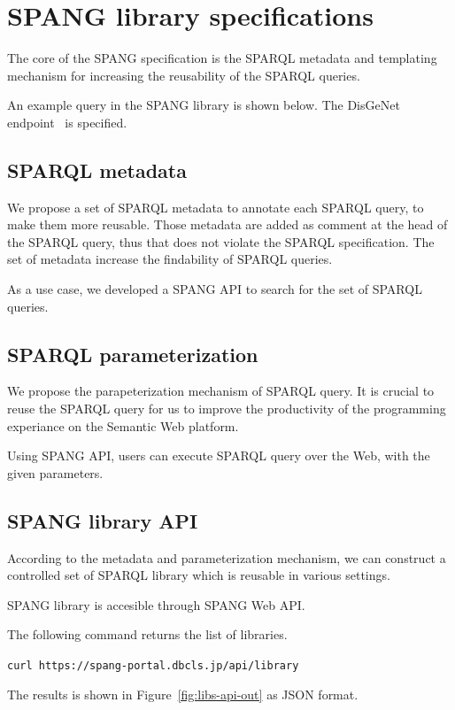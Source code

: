 \documentclass[runningheads]{llncs}
\begin{document}
\section{SPANG library specifications}

The core of the SPANG specification is the SPARQL metadata and templating mechanism for increasing the reusability of the SPARQL queries.

An example query in the SPANG library is shown below.
The DisGeNet endpoint~\cite{disgenet} is specified.


\subsection{SPARQL metadata}

We propose a set of SPARQL metadata to annotate each SPARQL query, to make them more reusable.
Those metadata are added as comment at the head of the SPARQL query, thus that does not violate the SPARQL specification. 
The set of metadata increase the findability of SPARQL queries.

As a use case, we developed a SPANG API to search for the set of SPARQL queries.

\subsection{SPARQL parameterization}

We propose the parapeterization mechanism of SPARQL query. It is crucial to reuse the SPARQL query for us to improve the productivity of the programming experiance on the Semantic Web platform.

Using SPANG API, users can execute SPARQL query over the Web, with the given parameters.


\subsection{SPANG library API}
According to the metadata and parameterization mechanism, we can construct a controlled set of SPARQL library which is reusable in various settings.

SPANG library is accesible through SPANG Web API.

The following command returns the list of libraries.

\texttt{curl https://spang-portal.dbcls.jp/api/library}

The results is shown in Figure~\ref{fig:libs-api-out} as JSON format.
\end{document}
